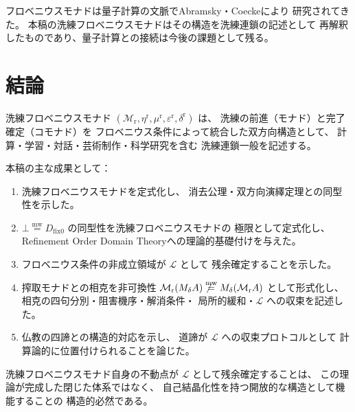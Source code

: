 \documentclass[11pt,a4paper]{article}
\theoremstyle{definition}
\newcommand{\mweq}{\mathrel{\overset{\mathrm{mw}}{=}}}
\newcommand{\dfix}{D_{\mathrm{fix}0}}
\newcommand{\Lhagma}{\mathcal{L}}
\newcommand{\Mr}{\mathcal{M}_{\mathrm{r}}}
\newcommand{\Md}{M_{\delta}}
\newcommand{\etar}{\eta^{\mathrm{r}}}
\newcommand{\mur}{\mu^{\mathrm{r}}}
\newcommand{\epsr}{\varepsilon^{\mathrm{r}}}
\newcommand{\deltar}{\delta^{\mathrm{r}}}
\begin{document}
フロベニウスモナドは量子計算の文脈でAbramsky・Coeckeにより
研究されてきた\cite{Abramsky2004}。
本稿の洗練フロベニウスモナドはその構造を洗練連鎖の記述として
再解釈したものであり、量子計算との接続は今後の課題として残る。

\section{結論}

洗練フロベニウスモナド $(\Mr, \etar, \mur, \epsr, \deltar)$ は、
洗練の前進（モナド）と完了確定（コモナド）を
フロベニウス条件によって統合した双方向構造として、
計算・学習・対話・芸術制作・科学研究を含む
洗練連鎖一般を記述する。

本稿の主な成果として：

\begin{enumerate}
  \item 洗練フロベニウスモナドを定式化し、
    消去公理・双方向演繹定理との同型性を示した。

  \item $\bot \mweq \dfix$ の同型性を洗練フロベニウスモナドの
    極限として定式化し、
    Refinement Order Domain Theoryへの理論的基礎付けを与えた。

  \item フロベニウス条件の非成立領域が $\Lhagma$ として
    残余確定することを示した。

  \item 搾取モナドとの相克を非可換性 $\Mr(\Md A) \not\mweq \Md(\Mr A)$
    として形式化し、相克の四句分別・阻害機序・解消条件・
    局所的緩和・$\Lhagma$ への収束を記述した。

  \item 仏教の四諦との構造的対応を示し、
    道諦が $\Lhagma$ への収束プロトコルとして
    計算論的に位置付けられることを論じた。
\end{enumerate}

洗練フロベニウスモナド自身の不動点が $\Lhagma$ として残余確定することは、
この理論が完成した閉じた体系ではなく、
自己結晶化性を持つ開放的な構造として機能することの
構造的必然である。
\end{document}
